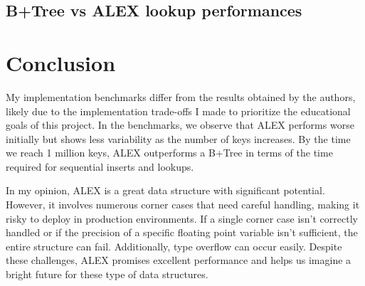 \section{B+Tree vs ALEX lookup performances}

\let\clearpage\relax
\chapter{Conclusion}
My implementation benchmarks differ from the results obtained by the authors, likely due to the implementation trade-offs I made to prioritize the educational goals of this project. In the benchmarks, we observe that ALEX performs worse initially but shows less variability as the number of keys increases. By the time we reach 1 million keys, ALEX outperforms a B+Tree in terms of the time required for sequential inserts and lookups.

In my opinion, ALEX is a great data structure with significant potential. However, it involves numerous corner cases that need careful handling, making it risky to deploy in production environments. If a single corner case isn't correctly handled or if the precision of a specific floating point variable isn't sufficient, the entire structure can fail. Additionally, type overflow can occur easily. Despite these challenges, ALEX promises excellent performance and helps us imagine a bright future for these type of data structures.
